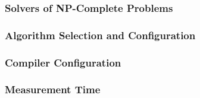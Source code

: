 \subsubsection{Solvers of NP-Complete Problems}
\label{subsec:np}

\subsubsection{Algorithm Selection and Configuration}
\label{subsec:algsel}

\subsubsection{Compiler Configuration}
\label{subsec:compilerconfig}

\subsubsection{Measurement Time}
\label{subsec:measure}
